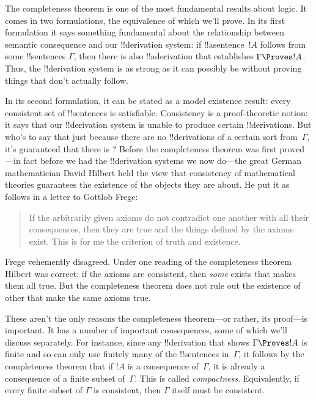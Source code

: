 \documentclass[../../../include/open-logic-section]{subfiles}
\begin{document}
      {}
      {}


The completeness theorem is one of the most fundamental results about
logic.  It comes in two formulations, the equivalence of which we'll
prove.  In its first formulation it says something fundamental about
the relationship between semantic consequence and our !!{derivation}
system: if !!a{sentence}~$!A$ follows from some !!{sentence}s
$\Gamma$, then there is also !!a{derivation} that establishes $\Gamma
\Proves !A$. Thus, the !!{derivation} system is as strong as it can
possibly be without proving things that don't actually follow.

In its second formulation, it can be stated as a model existence
result: every consistent set of !!{sentence}s is satisfiable.
Consistency is a proof-theoretic notion: it says that our
!!{derivation} system is unable to produce certain !!{derivation}s.
But who's to say that just because there are no !!{derivation}s of a
certain sort from~$\Gamma$, it's guaranteed that there is
? Before the
completeness theorem was first proved---in fact before we had the
!!{derivation} systems we now do---the great German mathematician
David Hilbert held the view that consistency of mathematical theories
guarantees the existence of the objects they are about. He put it as
follows in a letter to Gottlob Frege:
\begin{quote}
  If the arbitrarily given axioms do not contradict one another with
  all their consequences, then they are true and the things defined by
  the axioms exist. This is for me the criterion of truth and
  existence. 
\end{quote}
Frege vehemently disagreed. 
Under one reading of the completeness
theorem Hilbert was correct: if the
axioms are consistent, then \emph{some}
 exists that makes them all
true.
But the completeness theorem does not rule out the existence of other  that make the same axioms true.

These aren't the only reasons the completeness theorem---or rather,
its proof---is important.  It has a number of important consequences,
some of which we'll discuss separately.  For instance, since any
!!{derivation} that shows $\Gamma \Proves !A$ is finite and so can
only use finitely many of the !!{sentence}s in~$\Gamma$, it follows by
the completeness theorem that if $!A$ is a consequence of~$\Gamma$, it
is already a consequence of a finite subset of~$\Gamma$.  This is
called \emph{compactness}.  Equivalently, if every finite subset of
$\Gamma$ is consistent, then $\Gamma$ itself must be consistent.
\end{document}
